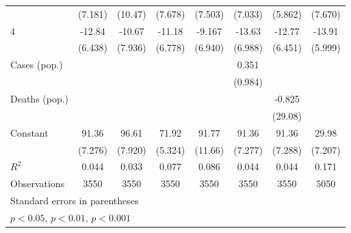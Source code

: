 \documentclass{article}
\begin{document}
{\begin{longtable}{l*{7}{c}}
                &  (7.181)         &  (10.47)         &  (7.678)         &  (7.503)         &  (7.033)         &  (5.862)         &  (7.670)         \\
4               &   -12.84         &   -10.67         &   -11.18         &   -9.167         &   -13.63         &   -12.77         &   -13.91\sym{*}  \\
                &  (6.438)         &  (7.936)         &  (6.778)         &  (6.940)         &  (6.988)         &  (6.451)         &  (5.999)         \\
Cases (pop.)    &                  &                  &                  &                  &    0.351         &                  &                  \\
                &                  &                  &                  &                  &  (0.984)         &                  &                  \\
Deaths (pop.)   &                  &                  &                  &                  &                  &   -0.825         &                  \\
                &                  &                  &                  &                  &                  &  (29.08)         &                  \\
Constant        &    91.36\sym{***}&    96.61\sym{***}&    71.92\sym{***}&    91.77\sym{***}&    91.36\sym{***}&    91.36\sym{***}&    29.98\sym{***}\\
                &  (7.276)         &  (7.920)         &  (5.324)         &  (11.66)         &  (7.277)         &  (7.288)         &  (7.207)         \\
\hline
\(R^{2}\)       &    0.044         &    0.033         &    0.077         &    0.086         &    0.044         &    0.044         &    0.171         \\
Observations    &     3550         &     3550         &     3550         &     3550         &     3550         &     3550         &     5050         \\
\hline\hline
\multicolumn{8}{l}{\footnotesize Standard errors in parentheses}\\
\multicolumn{8}{l}{\footnotesize \sym{*} \(p<0.05\), \sym{**} \(p<0.01\), \sym{***} \(p<0.001\)}\\
\end{longtable}
}
\end{document}

